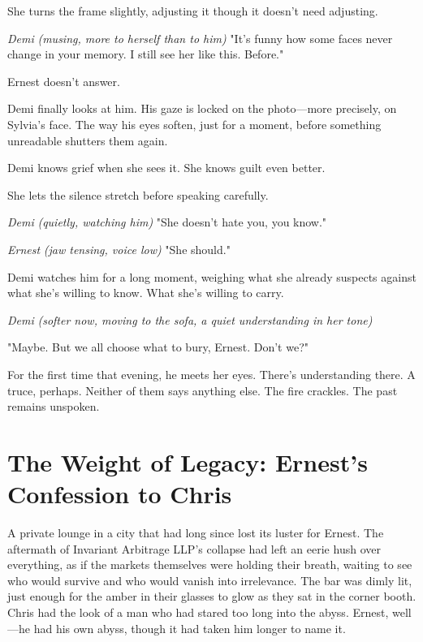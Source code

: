 \midskip

\noindent
She turns the frame slightly, adjusting it though it doesn’t need adjusting.

\midskip

\textit{Demi} \textit{(musing, more to herself than to him)}  
"It’s funny how some faces never change in your memory. I still see her like this. Before."

\midskip

Ernest doesn’t answer.

\midskip

Demi finally looks at him. His gaze is locked on the photo—more precisely, on Sylvia’s face. The way his eyes soften, just for a moment, before something unreadable shutters them again.

Demi knows grief when she sees it. She knows guilt even better.

She lets the silence stretch before speaking carefully.

\midskip

\textit{Demi} \textit{(quietly, watching him)}  
"She doesn’t hate you, you know."

\midskip

\textit{Ernest} \textit{(jaw tensing, voice low)}  
"She should."

\midskip

Demi watches him for a long moment, weighing what she already suspects against what she’s willing to know. What she’s willing to carry.

\midskip

\textit{Demi} \textit{(softer now, moving to the sofa, a quiet understanding in her tone)} 

"Maybe. But we all choose what to bury, Ernest. Don’t we?"

\midskip

For the first time that evening, he meets her eyes. There’s understanding there. A truce, perhaps. Neither of them says anything else. The fire crackles. The past remains unspoken.

\section*{The Weight of Legacy: Ernest's Confession to Chris}

A private lounge in a city that had long since lost its luster for Ernest. The aftermath of Invariant Arbitrage LLP’s collapse had left an eerie hush over everything, as if the markets themselves were holding their breath, waiting to see who would survive and who would vanish into irrelevance. The bar was dimly lit, just enough for the amber in their glasses to glow as they sat in the corner booth. Chris had the look of a man who had stared too long into the abyss. Ernest, well—he had his own abyss, though it had taken him longer to name it.

